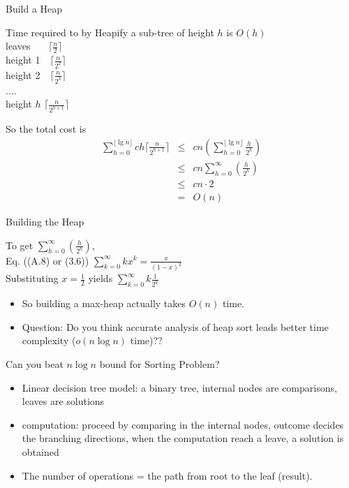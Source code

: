 \documentclass{beamer}
\begin{document}
\begin{frame}{}
\begin{center}
Build a Heap
\end{center}
\begin{center}
Time required to by {\sc Heapify} a sub-tree of height $h$ is $O(h)$\\
leaves \ \ \ $\lceil \frac{n}{2}\rceil$ \\
height 1\ \  $\lceil \frac{n}{2^2}\rceil$ \\
height 2\ \  $\lceil \frac{n}{2^3}\rceil$ \\
.... \\
height $h$  $\lceil \frac{n}{2^{h+1}}\rceil$ \\
\end{center}
\end{frame}

\begin{frame}{}
So the total cost is 
\begin{eqnarray*}
\sum_{h=0}^{\lfloor \lg n\rfloor}ch\lceil \frac{n}{2^{h+1}}\rceil &\le&
 cn(\sum_{h=0}^{\lfloor \lg n\rfloor}\frac{h}{2^h}) \\
&\le& cn \sum_{h=0}^\infty (\frac{h}{2^h}) \\
&\le & cn\cdot 2 \\
&=& O(n)
\end{eqnarray*}
\end{frame}

\begin{frame}{}
\begin{center}
Building the Heap

To get $\sum_{h=0}^\infty(\frac{h}{2^h})$, \\
Eq. ((A.8) or (3.6)) $\sum_{k=0}^\infty kx^k = \frac{x}{(1-x)^2}$ \\
Substituting $x = \frac{1}{2}$ yields $\sum_{k=0}^\infty k\frac{1}{2^k}$
\end{center}
\begin{itemize}
\item So building a max-heap actually takes $O(n)$ time.
\item Question: Do you think accurate analysis of heap sort leads better
 time complexity ($o(n\log n)$ time)??
\end{itemize}
\end{frame}

\begin{frame}{}
\begin{center}
Can you beat $n\log n$ bound for Sorting Problem?
\end{center}
\begin{itemize}
\item Linear decision tree model: a binary tree, internal nodes are 
comparisons, leaves are solutions
\item computation: proceed by comparing in the internal nodes,
outcome decides the branching directions, when the computation reach
a leave, a solution is obtained
\item The number of operations = the path from root to the leaf (result).
\end{itemize}
\end{frame}
\end{document}
